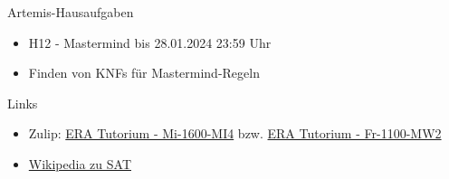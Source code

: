 \documentclass[
  german,            %
  aspectratio=169,    %
]{tumbeamer}
\begin{document}
\begin{frame}[c, fragile]{Artemis-Hausaufgaben}{}
  \begin{itemize}
    \item H12 - Mastermind bis 28.01.2024 23:59 Uhr
    \item Finden von KNFs für Mastermind-Regeln
  \end{itemize}
\end{frame}

\begin{frame}[fragile, c]{Links}{}
  \begin{itemize}
    \item Zulip: \href{https://zulip.in.tum.de/#narrow/stream/1917-ERA-Tutorium---Mi-1600-MI4}{\glqq ERA Tutorium - Mi-1600-MI4\grqq}
          bzw. \href{https://zulip.in.tum.de/#narrow/stream/1940-ERA-Tutorium---Fr-1100-MW2}{\glqq ERA Tutorium - Fr-1100-MW2\grqq}
    \item \href{https://en.wikipedia.org/wiki/Boolean_satisfiability_problem}{Wikipedia zu SAT}
  \end{itemize}
\end{frame}

\maketitle
\end{document}
